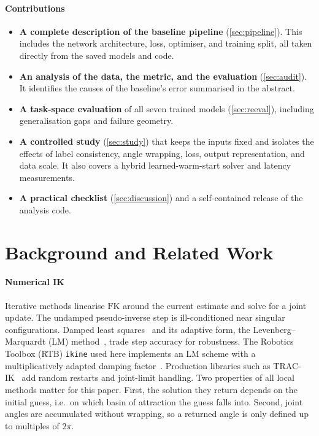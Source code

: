 \documentclass[conference]{IEEEtran}
\newcommand{\FK}{\mathrm{FK}}
\newcommand{\code}[1]{\texttt{#1}}
\begin{document}
\paragraph{Contributions}
\begin{itemize}
\item \textbf{A complete description of the baseline pipeline} (\cref{sec:pipeline}). This includes the network architecture, loss, optimiser, and training split, all taken directly from the saved models and code.
\item \textbf{An analysis of the data, the metric, and the evaluation} (\cref{sec:audit}). It identifies the causes of the baseline's error summarised in the abstract.
\item \textbf{A task-space evaluation} of all seven trained models (\cref{sec:reeval}), including generalisation gaps and failure geometry.
\item \textbf{A controlled study} (\cref{sec:study}) that keeps the inputs fixed and isolates the effects of label consistency, angle wrapping, loss, output representation, and data scale. It also covers a hybrid learned-warm-start solver and latency measurements.
\item \textbf{A practical checklist} (\cref{sec:discussion}) and a self-contained release of the analysis code.
\end{itemize}

\section{Background and Related Work}
\label{sec:related}

\paragraph{Numerical IK}
Iterative methods linearise $\FK$ around the current estimate and solve for a joint update. The undamped pseudo-inverse step is ill-conditioned near singular configurations. Damped least squares~\cite{wampler1986manipulator,nakamura1986inverse} and its adaptive form, the Levenberg--Marquardt (LM) method~\cite{levenberg1944method,marquardt1963algorithm,sugihara2011solvability}, trade step accuracy for robustness. The Robotics Toolbox (RTB) \code{ikine} used here implements an LM scheme with a multiplicatively adapted damping factor~\cite{corke2017rvc}. Production libraries such as TRAC-IK~\cite{beeson2015trac} add random restarts and joint-limit handling. Two properties of all local methods matter for this paper. First, the solution they return depends on the initial guess, i.e.\ on which basin of attraction the guess falls into. Second, joint angles are accumulated without wrapping, so a returned angle is only defined up to multiples of $2\pi$.
\end{document}
